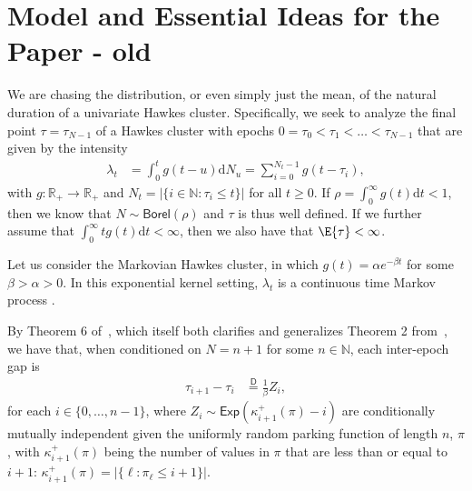 \section{Model and Essential Ideas for the Paper - old}


We are chasing the distribution, or even simply just the mean, of the natural duration of a univariate Hawkes cluster. Specifically, we seek to analyze the final point $\tau = \tau_{N-1}$ of a Hawkes cluster with epochs $0 = \tau_0 < \tau_1 < \dots < \tau_{N-1}$ that are given by the intensity
\begin{align}
\lambda_t
&=
\int_0^t g(t-u)\mathrm{d}N_u
=
\sum_{i=0}^{N_t-1}
g(t-\tau_i)
,
\end{align}
with $g:\mathbb{R}_+ \to \mathbb{R}_+$ and $N_t = |\{i \in \mathbb{N} : \tau_i \leq t\}|$ for all $t \geq 0$. If $\rho = \int_0^\infty g(t) \mathrm{d}t < 1$, then we know that $N \sim \mathsf{Borel}(\rho)$ and $\tau$ is thus well defined. If we further assume that $\int_0^\infty t g(t) \mathrm{d}t < \infty$, then we also have that $\E{\tau} < \infty$. 


Let us consider the Markovian Hawkes cluster, in which $g(t) = \alpha e^{-\beta t}$ for some $\beta > \alpha > 0$. In this exponential kernel setting, $\lambda_t$ is a continuous time Markov process \citep{oakes1975markovian}.

By Theorem 6 of~\citet{daw2026asymmetries}, which itself both clarifies and generalizes Theorem 2 from~\citet{daw2023conditional}, we have that, when conditioned on $N=n+1$ for some $n \in \mathbb{N}$,  each inter-epoch gap is 
\begin{align}
\tau_{i+1} - \tau_{i}
&\stackrel{\mathsf{D}}{=}
\frac{1}{\beta} Z_i
,
\label{expId}
\end{align}
for each $i \in \{0, \dots, n-1\}$, where $Z_i \sim \mathsf{Exp}\left(\kappa_{i+1}^+(\pi) - i\right)$ are conditionally mutually independent given the uniformly random parking function of length $n$, $\pi$, with $\kappa_{i+1}^+(\pi)$ being the number of values in $\pi$ that are less than or equal to $i+1$: $\kappa_{i+1}^+(\pi) = |\{\ell : \pi_\ell \leq i+1\}|$.



